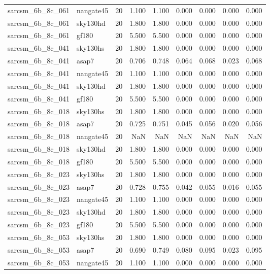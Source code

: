 \begin{tabular}{llrrrrrrr}
sarcsm\_6b\_8c\_061 & nangate45 & 20 & 1.100 & 1.100 & 0.000 & 0.000 & 0.000 & 0.000 \\
sarcsm\_6b\_8c\_061 & sky130hd & 20 & 1.800 & 1.800 & 0.000 & 0.000 & 0.000 & 0.000 \\
sarcsm\_6b\_8c\_061 & gf180 & 20 & 5.500 & 5.500 & 0.000 & 0.000 & 0.000 & 0.000 \\
sarcsm\_6b\_8c\_041 & sky130hs & 20 & 1.800 & 1.800 & 0.000 & 0.000 & 0.000 & 0.000 \\
sarcsm\_6b\_8c\_041 & asap7 & 20 & 0.706 & 0.748 & 0.064 & 0.068 & 0.023 & 0.068 \\
sarcsm\_6b\_8c\_041 & nangate45 & 20 & 1.100 & 1.100 & 0.000 & 0.000 & 0.000 & 0.000 \\
sarcsm\_6b\_8c\_041 & sky130hd & 20 & 1.800 & 1.800 & 0.000 & 0.000 & 0.000 & 0.000 \\
sarcsm\_6b\_8c\_041 & gf180 & 20 & 5.500 & 5.500 & 0.000 & 0.000 & 0.000 & 0.000 \\
sarcsm\_6b\_8c\_018 & sky130hs & 20 & 1.800 & 1.800 & 0.000 & 0.000 & 0.000 & 0.000 \\
sarcsm\_6b\_8c\_018 & asap7 & 20 & 0.725 & 0.751 & 0.045 & 0.056 & 0.020 & 0.056 \\
sarcsm\_6b\_8c\_018 & nangate45 & 20 & NaN & NaN & NaN & NaN & NaN & NaN \\
sarcsm\_6b\_8c\_018 & sky130hd & 20 & 1.800 & 1.800 & 0.000 & 0.000 & 0.000 & 0.000 \\
sarcsm\_6b\_8c\_018 & gf180 & 20 & 5.500 & 5.500 & 0.000 & 0.000 & 0.000 & 0.000 \\
sarcsm\_6b\_8c\_023 & sky130hs & 20 & 1.800 & 1.800 & 0.000 & 0.000 & 0.000 & 0.000 \\
sarcsm\_6b\_8c\_023 & asap7 & 20 & 0.728 & 0.755 & 0.042 & 0.055 & 0.016 & 0.055 \\
sarcsm\_6b\_8c\_023 & nangate45 & 20 & 1.100 & 1.100 & 0.000 & 0.000 & 0.000 & 0.000 \\
sarcsm\_6b\_8c\_023 & sky130hd & 20 & 1.800 & 1.800 & 0.000 & 0.000 & 0.000 & 0.000 \\
sarcsm\_6b\_8c\_023 & gf180 & 20 & 5.500 & 5.500 & 0.000 & 0.000 & 0.000 & 0.000 \\
sarcsm\_6b\_8c\_053 & sky130hs & 20 & 1.800 & 1.800 & 0.000 & 0.000 & 0.000 & 0.000 \\
sarcsm\_6b\_8c\_053 & asap7 & 20 & 0.690 & 0.749 & 0.080 & 0.095 & 0.023 & 0.095 \\
sarcsm\_6b\_8c\_053 & nangate45 & 20 & 1.100 & 1.100 & 0.000 & 0.000 & 0.000 & 0.000 \\

\end{tabular}
